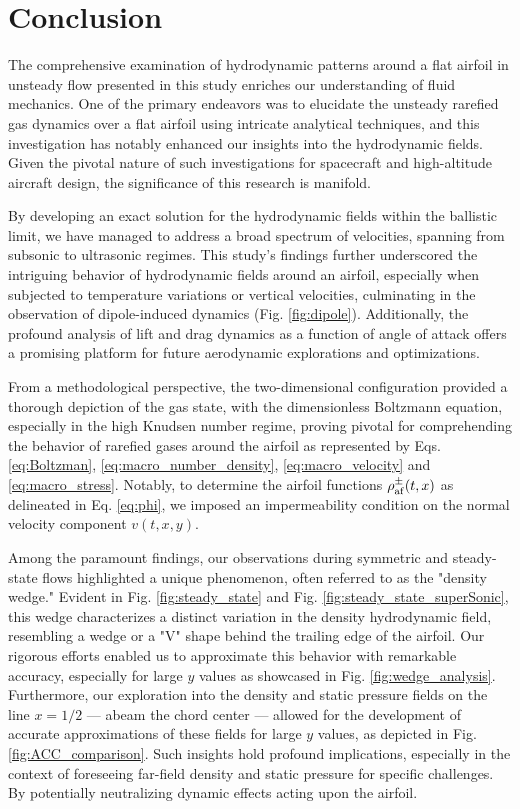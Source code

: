 \chapter{Conclusion}
The comprehensive examination of hydrodynamic patterns around a flat airfoil in unsteady flow presented in this study enriches our understanding of fluid mechanics. One of the primary endeavors was to elucidate the unsteady rarefied gas dynamics over a flat airfoil using intricate analytical techniques, and this investigation has notably enhanced our insights into the hydrodynamic fields. Given the pivotal nature of such investigations for spacecraft and high-altitude aircraft design, the significance of this research is manifold.

By developing an exact solution for the hydrodynamic fields within the ballistic limit, we have managed to address a broad spectrum of velocities, spanning from subsonic to ultrasonic regimes. This study's findings further underscored the intriguing behavior of hydrodynamic fields around an airfoil, especially when subjected to temperature variations or vertical velocities, culminating in the observation of dipole-induced dynamics (Fig. \ref{fig:dipole}). Additionally, the profound analysis of lift and drag dynamics as a function of angle of attack offers a promising platform for future aerodynamic explorations and optimizations.

From a methodological perspective, the two-dimensional configuration provided a thorough depiction of the gas state, with the dimensionless Boltzmann equation, especially in the high Knudsen number regime, proving pivotal for comprehending the behavior of rarefied gases around the airfoil as represented by Eqs. \ref{eq:Boltzman}, \ref{eq:macro_number_density}, \ref{eq:macro_velocity} and \ref{eq:macro_stress}. Notably, to determine the airfoil functions $\rho_{\mathrm{af}}^\pm(t,x)$ as delineated in Eq. \ref{eq:phi}, we imposed an impermeability condition on the normal velocity component $v(t,x,y)$.

Among the paramount findings, our observations during symmetric and steady-state flows highlighted a unique phenomenon, often referred to as the "density wedge." Evident in Fig. \ref{fig:steady_state} and Fig. \ref{fig:steady_state_superSonic}, this wedge characterizes a distinct variation in the density hydrodynamic field, resembling a wedge or a "V" shape behind the trailing edge of the airfoil. Our rigorous efforts enabled us to approximate this behavior with remarkable accuracy, especially for large $y$ values as showcased in Fig. \ref{fig:wedge_analysis}. 
Furthermore, our exploration into the density and static pressure fields on the line $x=1/2$ — abeam the chord center — allowed for the development of accurate approximations of these fields for large $y$ values, as depicted in Fig. \ref{fig:ACC_comparison}. 
Such insights hold profound implications, especially in the context of foreseeing far-field density and static pressure for specific challenges. By potentially neutralizing dynamic effects acting upon the airfoil.

